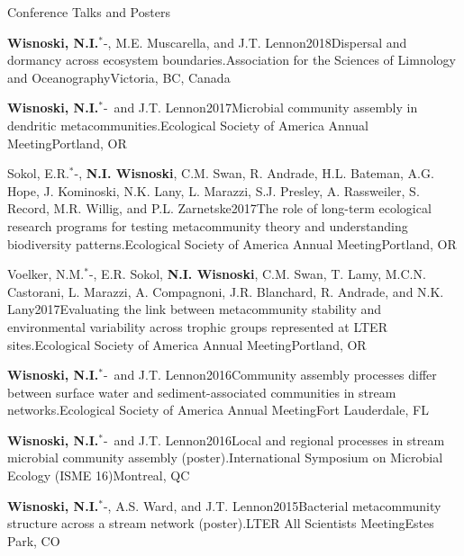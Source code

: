 \documentclass{resume} %
\newcommand{\Star}{\ensuremath{^*}\kern-\scriptspace}
\begin{document}
\begin{rhangSection}{Conference Talks and Posters}
  \begin{Presentation}{{\bf Wisnoski, N.I.}\Star, M.E. Muscarella, and J.T. Lennon}{2018}{Dispersal and dormancy across ecosystem boundaries.}{Association for the Sciences of Limnology and Oceanography}{Victoria, BC, Canada}
  \end{Presentation}

  \begin{Presentation}{{\bf Wisnoski, N.I.}\Star\ and J.T. Lennon}{2017}{Microbial community assembly in dendritic metacommunities.}{Ecological Society of America Annual Meeting}{Portland, OR}
  \end{Presentation}
  
  \begin{Presentation}{Sokol, E.R.\Star, {\bf N.I. Wisnoski}, C.M. Swan, R. Andrade, H.L. Bateman, A.G. Hope, J. Kominoski, N.K. Lany, L. Marazzi, S.J. Presley, A. Rassweiler, S. Record, M.R. Willig, and P.L. Zarnetske}{2017}{The role of long-term ecological research programs for testing metacommunity theory and understanding biodiversity patterns.}{Ecological Society of America Annual Meeting}{Portland, OR}
  \end{Presentation}
  
  \begin{Presentation}{Voelker, N.M.\Star, E.R. Sokol, {\bf N.I. Wisnoski}, C.M. Swan, T. Lamy, M.C.N. Castorani, L. Marazzi, A. Compagnoni, J.R. Blanchard, R. Andrade, and N.K. Lany}{2017}{Evaluating the link between metacommunity stability and environmental variability across trophic groups represented at LTER sites.}{Ecological Society of America Annual Meeting}{Portland, OR}
  \end{Presentation}

  \begin{Presentation}{{\bf Wisnoski, N.I.}\Star\ and J.T. Lennon}{2016}{Community assembly processes differ between surface water and sediment-associated communities in stream networks.}{Ecological Society of America Annual Meeting}{Fort Lauderdale, FL}
  \end{Presentation}

  \begin{Presentation}{{\bf Wisnoski, N.I.}\Star\ and J.T. Lennon}{2016}{Local and regional processes in stream microbial community assembly (poster).}{International Symposium on Microbial Ecology (ISME 16)}{Montreal, QC}
  \end{Presentation}

  \begin{Presentation}{{\bf Wisnoski, N.I.}\Star, A.S. Ward, and J.T. Lennon}{2015}{Bacterial metacommunity structure across a stream network (poster).}{LTER All Scientists Meeting}{Estes Park, CO}
  \end{Presentation}

\end{rhangSection}
\end{document}
